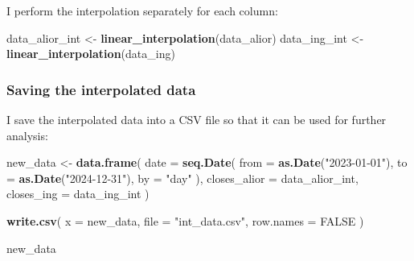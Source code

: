 \documentclass[
]{article}
\newenvironment{Shaded}{\begin{snugshade}}{\end{snugshade}}
\newcommand{\AttributeTok}[1]{\textcolor[rgb]{0.13,0.29,0.53}{#1}}
\newcommand{\ConstantTok}[1]{\textcolor[rgb]{0.56,0.35,0.01}{#1}}
\newcommand{\FunctionTok}[1]{\textcolor[rgb]{0.13,0.29,0.53}{\textbf{#1}}}
\newcommand{\NormalTok}[1]{#1}
\newcommand{\OtherTok}[1]{\textcolor[rgb]{0.56,0.35,0.01}{#1}}
\newcommand{\StringTok}[1]{\textcolor[rgb]{0.31,0.60,0.02}{#1}}
\begin{document}
I perform the interpolation separately for each column:

\begin{Shaded}
\begin{Highlighting}[]
\NormalTok{data\_alior\_int }\OtherTok{\textless{}{-}} \FunctionTok{linear\_interpolation}\NormalTok{(data\_alior)}
\NormalTok{data\_ing\_int }\OtherTok{\textless{}{-}} \FunctionTok{linear\_interpolation}\NormalTok{(data\_ing)}
\end{Highlighting}
\end{Shaded}

\subsubsection{Saving the interpolated
data}\label{saving-the-interpolated-data}

I save the interpolated data into a CSV file so that it can be used for
further analysis:

\begin{Shaded}
\begin{Highlighting}[]
\NormalTok{new\_data }\OtherTok{\textless{}{-}} \FunctionTok{data.frame}\NormalTok{(}
  \AttributeTok{date =} \FunctionTok{seq.Date}\NormalTok{(}
    \AttributeTok{from =} \FunctionTok{as.Date}\NormalTok{(}\StringTok{"2023{-}01{-}01"}\NormalTok{),}
    \AttributeTok{to =} \FunctionTok{as.Date}\NormalTok{(}\StringTok{"2024{-}12{-}31"}\NormalTok{),}
    \AttributeTok{by =} \StringTok{"day"}
\NormalTok{  ),}
  \AttributeTok{closes\_alior =}\NormalTok{ data\_alior\_int,}
  \AttributeTok{closes\_ing =}\NormalTok{ data\_ing\_int}
\NormalTok{)}

\FunctionTok{write.csv}\NormalTok{(}
  \AttributeTok{x =}\NormalTok{ new\_data,}
  \AttributeTok{file =} \StringTok{"int\_data.csv"}\NormalTok{,}
  \AttributeTok{row.names =} \ConstantTok{FALSE}
\NormalTok{)}
\end{Highlighting}
\end{Shaded}

\begin{Shaded}
\begin{Highlighting}[]
\NormalTok{new\_data}
\end{Highlighting}
\end{Shaded}
\end{document}
